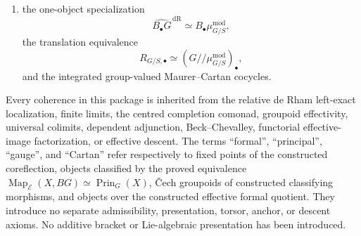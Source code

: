 \begin{theorem}
\begin{enumerate}
    $P_\chi=X\times_{BG}S$, recognition of these objects by effective
    epimorphism plus invertible shear, the classification equivalence
    \[
        \operatorname{Map}_{\mathcal E}(X,BG)
        \simeq
        \operatorname{Prin}_G(X),
    \]
    and the gauge groupoid
    \[
        \operatorname{Gauge}(P_\chi)
        =
        \check C_\bullet(\chi);
    \]
    \item the one-object specialization
    \[
        \widehat{B_\bullet G}^{\,\mathrm{dR}}
        \simeq
        B_\bullet\mu^{\mathrm{mod}}_{G/S},
    \]
    the translation equivalence
    \[
        R_{G/S,\bullet}
        \simeq
        (G/\!/\mu^{\mathrm{mod}}_{G/S})_\bullet,
    \]
    and the integrated group-valued Maurer--Cartan cocycles.
\end{enumerate}
Every coherence in this package is inherited from the relative de Rham
left-exact localization, finite limits, the centred completion comonad,
groupoid effectivity, universal colimits, dependent adjunction,
Beck--Chevalley, functorial effective-image factorization, or effective
descent.  The terms ``formal'', ``principal'', ``gauge'', and ``Cartan''
refer respectively to fixed points of the constructed coreflection, objects
classified by the proved equivalence
$\operatorname{Map}_{\mathcal E}(X,BG)\simeq\operatorname{Prin}_G(X)$,
\v{C}ech groupoids of constructed classifying morphisms, and objects over the
constructed effective formal quotient.  They introduce no separate
admissibility, presentation, torsor, anchor, or descent axioms.  No additive
bracket or Lie-algebraic presentation has been introduced.
\end{theorem}

